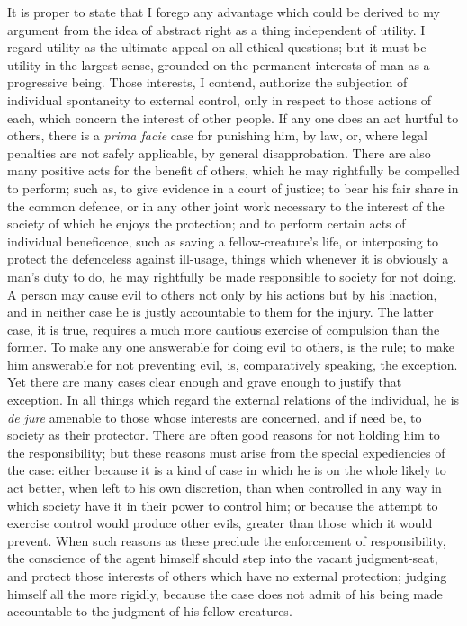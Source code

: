 \documentclass[12pt]{report}
\begin{document}
It is proper to state that I forego any advantage which could be derived to my argument from the idea of abstract right as a thing independent of utility. I regard utility as the ultimate appeal on all ethical questions; but it must be utility in the largest sense, grounded on the permanent interests of man as a progressive being. Those interests, I contend, authorize the subjection of individual spontaneity to external control, only in respect to those actions of each, which concern the interest of other people. If any one does an act hurtful to others, there is a \emph{prima facie} case for punishing him, by law, or, where legal penalties are not safely applicable, by general disapprobation. There are also many positive acts for the benefit of others, which he may rightfully be compelled to perform; such as, to give evidence in a court of justice; to bear his fair share in the common defence, or in any other joint work necessary to the interest of the society of which he enjoys the protection; and to perform certain acts of individual beneficence, such as saving a fellow-creature's life, or interposing to protect the defenceless against ill-usage, things which whenever it is obviously a man's duty to do, he may rightfully be made responsible to society for not doing. A person may cause evil to others not only by his actions but by his inaction, and in neither case he is justly accountable to them for the injury. The latter case, it is true, requires a much more cautious exercise of compulsion than the former. To make any one answerable for doing evil to others, is the rule; to make him answerable for not preventing evil, is, comparatively speaking, the exception. Yet there are many cases clear enough and grave enough to justify that exception. In all things which regard the external relations of the individual, he is \emph{de jure} amenable to those whose interests are concerned, and if need be, to society as their protector. There are often good reasons for not holding him to the responsibility; but these reasons must arise from the special expediencies of the case: either because it is a kind of case in which he is on the whole likely to act better, when left to his own discretion, than when controlled in any way in which society have it in their power to control him; or because the attempt to exercise control would produce other evils, greater than those which it would prevent. When such reasons as these preclude the enforcement of responsibility, the conscience of the agent himself should step into the vacant judgment-seat, and protect those interests of others which have no external protection; judging himself all the more rigidly, because the case does not admit of his being made accountable to the judgment of his fellow-creatures.
\end{document}
